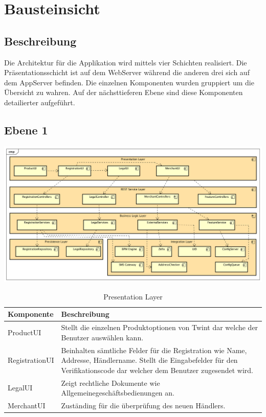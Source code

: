 \graphicspath{{./images/}}

\chapter{Bausteinsicht}

\section{Beschreibung}

Die Architektur für die Applikation wird mittels vier Schichten realisiert. Die Präsentationsschicht ist auf dem WebServer während die anderen drei sich auf dem AppServer befinden. Die einzelnen Komponenten wurden gruppiert um die Übersicht zu wahren. Auf der nächsttieferen Ebene sind diese Komponenten detailierter aufgeführt.

\begin{landscape}
\section{Ebene 1}

\begin{center}
	\includegraphics[scale=0.6]{ComponentLevel1.png}
\end{center}

\end{landscape}
\restoregeometry

\begin{table}[H]
	\centering
	\caption{Presentation Layer}
	\begin{tabular}{ | p{4cm} | p{12cm} | }
		\toprule
		{\textbf{Komponente}} & {\textbf{Beschreibung}} \\
		\midrule
		ProductUI &  Stellt die einzelnen Produktoptionen von Twint dar welche der Benutzer auswählen kann. \\ \hline
		RegistrationUI &  Beinhalten sämtliche Felder für die Registration wie Name, Addresse, Händlername. Stellt die Eingabefelder für den Verifikationscode dar welcher dem Benutzer zugesendet wird.\\ \hline
		LegalUI &  Zeigt rechtliche Dokumente wie Allgemeinegeschäftsbedienungen an. \\ \hline
		MerchantUI &  Zuständing für die überprüfung des neuen Händlers.\\
		\bottomrule
	\end{tabular}
\end{table}

